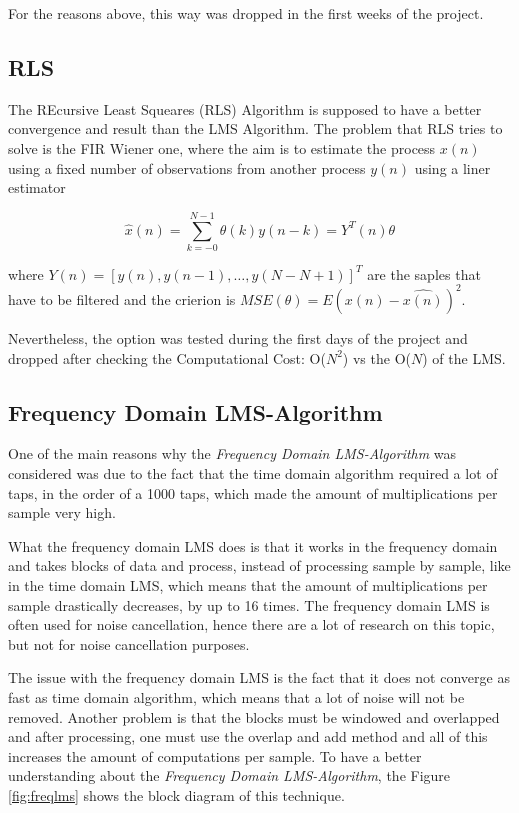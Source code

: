 \documentclass[11pt,a4paper,english]{book}  %
\theoremstyle{definition}  %
\theoremstyle{plain}  %
\theoremstyle{remark}  %
\begin{document}
	For the reasons above, this way was dropped in the first weeks of the project.
	
	\subsection{RLS}
	
	The REcursive Least Squeares (RLS) Algorithm \cite{asp} is supposed to have a better convergence and result than the LMS Algorithm. The problem that RLS tries to solve is the FIR Wiener one, where the aim is to estimate the process $x(n)$ using a fixed number of observations from another process ${y(n)}$ using a liner estimator
	
	\begin{equation}
	\hat{x}(n)=\sum \limits_{k=-0}^{N-1} \theta(k)y(n-k)=Y^T (n)\theta
	\end{equation}
	
	where $Y(n)= [y(n),y(n-1),\dots,y(N-N+1)]^T$ are the saples that have to be filtered and the crierion is $MSE(\theta)=E{(x(n)-\hat{x(n)})^2}$.
	
	Nevertheless, the option was tested during the first days of the project and dropped after checking the Computational Cost: O($N^2$) vs the  O($N$) of the LMS.
	
	
	\subsection{Frequency Domain LMS-Algorithm}
	
	One of the main reasons why the \textit{Frequency Domain LMS-Algorithm} was considered was due to the fact that the time domain algorithm required a lot of taps, in the order of a 1000 taps, which made the amount of multiplications per sample very high. 
	
What the frequency domain LMS does is that it works in the frequency domain and takes blocks of data and process, instead of processing sample by sample, like in the time domain LMS, which means that the amount of multiplications per sample drastically decreases, by up to 16 times. The frequency domain LMS is often used for noise cancellation, hence there are a lot of research on this topic, but not for noise cancellation purposes.

The issue with the frequency domain LMS is the fact that it does not converge as fast as time domain algorithm, which means that a lot of noise will not be removed. Another problem is that the blocks must be windowed and overlapped and after processing, one must use the overlap and add method and all of this increases the amount of computations per sample. To have a better understanding about the \textit{Frequency Domain LMS-Algorithm}, the Figure \ref{fig:freqlms} shows the block diagram of this technique.
\end{document}
